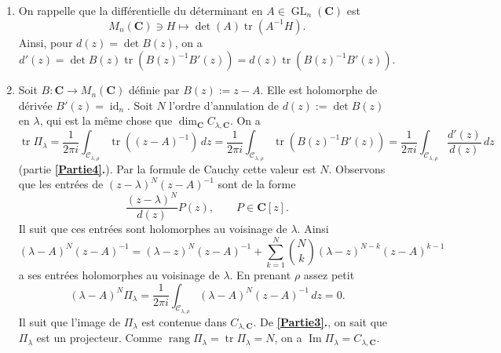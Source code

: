 \documentclass[french, 12pt]{article}
\theoremstyle{definition}
\newcommand{\tuple}[1]{\left(#1\right)}
\newcommand{\Cbb}{\mathbf{C}}
\newcommand{\Ccal}{\mathcal{C}}
\newcommand{\tr}{\operatorname{tr}}
\newcommand{\id}{\operatorname{id}}
\newcommand{\GL}{\operatorname{GL}}
\newcommand{\rang}{\operatorname{rang}}
\newcommand{\Img}{\operatorname{Im}}
\begin{document}
\begin{enumerate}
    \item \label{Partie4} On rappelle que la diff\'erentielle du d\'eterminant en $A \in \GL_n(\Cbb)$ est
        $$M_n(\Cbb) \owns H \mapsto \det(A)\tr(A^{-1}H).$$
    Ainsi, pour $d(z) = \det B(z)$, on a
        $$d'(z) = \det B(z) \tr(B(z)^{-1}B'(z)) = d(z)\tr(B(z)^{-1}B'(z)).$$
    
    \item \label{Partie5} Soit $B: \Cbb \to M_n(\Cbb)$ d\'efinie par $B(z):= z - A$. Elle est holomorphe de d\'eriv\'ee $B'(z) = \id_n$. Soit $N $ l'ordre d'annulation de $d(z) := \det B(z)$ en $\lambda$, qui est la m\^eme chose que $\dim_{\Cbb}C_{\lambda,\Cbb}$. 
    On a
        $$\tr \Pi_\lambda = \frac{1}{2\pi i}\int_{\Ccal_{\lambda,\rho}} \tr\tuple{(z-A)^{-1}}\,dz = \frac{1}{2\pi i}\int_{\Ccal_{\lambda,\rho}} \tr \tuple{B(z)^{-1}B'(z)} = \frac{1}{2\pi i} \int_{\Ccal_{\lambda,\rho}} \frac{d'(z)}{d(z)}\,dz$$
    (partie {\bf \ref{Partie4}.}). Par la formule de Cauchy cette valeur est $N$. Observons que les entr\'ees de $(z - \lambda)^N(z-A)^{-1}$   sont de la forme
        $$\dfrac{(z-\lambda)^N}{d(z)}P(z), \qquad P \in \Cbb[z].$$
    Il suit que ces entr\'ees sont holomorphes au voisinage de $\lambda$. Ainsi
        $$(\lambda - A)^N(z-A)^{-1} = (\lambda-z)^N(z-A)^{-1} + \sum_{k=1}^N \binom{N}{k}(\lambda - z)^{N-k}(z-A)^{k-1}$$
    a ses entr\'ees holomorphes au voisinage de $\lambda$. En prenant $\rho$ assez petit
        $$(\lambda - A)^N\Pi_{\lambda} = \frac{1}{2\pi i} \int_{\Ccal_{\lambda,\rho}} (\lambda - A)^N(z-A)^{-1}\,dz = 0.$$
    Il suit que l'image de $\Pi_\lambda$ est contenue dans $C_{\lambda,\Cbb}$. De {\bf \ref{Partie3}.}, on sait que $\Pi_\lambda$ est un projecteur. Comme $\rang \Pi_\lambda = \tr \Pi_\lambda = N$, on a $\Img \Pi_\lambda = C_{\lambda,\Cbb}$.
    

\end{enumerate}
\end{document}
